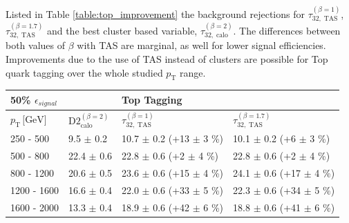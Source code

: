 Listed in Table \ref{table:top_improvement} the background rejections for $\tau_{32,\;\text{TAS}}^{(\beta=1)}$, $\tau_{32,\;\text{TAS}}^{(\beta=1.7)}$ and the best cluster based variable, $\tau_{32,\;\text{calo}}^{(\beta=2)}$. The differences between both values of $\beta$ with TAS are marginal, as well for lower signal efficiencies. Improvements due to the use of TAS instead of clusters are possible for Top quark tagging over the whole studied $p_{\mathrm{T}}$ range.
\begin{table}
\centering
\begin{tabular}{llll}
 \multicolumn{1}{l||}{\textbf{50\% $\epsilon_{signal}$}} &                                                & \textbf{Top Tagging}                                          &                                          \\ \hline
\multicolumn{1}{l||}{$p_{\mathrm{T}} \, \text{[GeV]}$}           & \multicolumn{1}{l|}{$\text{D2}_{\text{calo}}^{(\beta=2)}$} & \multicolumn{1}{l|}{$\tau_{32,\;\text{TAS}}^{(\beta=1)}$} & \multicolumn{1}{l|}{$\tau_{32,\;\text{TAS}}^{(\beta=1.7)}$} \\ \hline \hline
\multicolumn{1}{l||}{250 - 500}                       & \multicolumn{1}{l|}{9.5 $\pm$ 0.2}                      &  \multicolumn{1}{l|}{\cellcolor{Red!50}10.7 $\pm$ 0.2 (+13 $\pm$ 3 \%)}        & \multicolumn{1}{l|}{10.1 $\pm$ 0.2 (+6 $\pm$ 3 \%)}        \\
\multicolumn{1}{l||}{500 - 800}                       & \multicolumn{1}{l|}{22.4 $\pm$ 0.6}                      & \multicolumn{1}{l|}{\cellcolor{Red!50}22.8 $\pm$ 0.6 (+2 $\pm$ 4 \%)}         & \multicolumn{1}{l|}{\cellcolor{Red!50}22.8 $\pm$ 0.6 (+2 $\pm$ 4 \%)}         \\
\multicolumn{1}{l||}{800 - 1200}                      & \multicolumn{1}{l|}{20.6 $\pm$ 0.5}                      & \multicolumn{1}{l|}{23.6 $\pm$ 0.6 (+15 $\pm$ 4 \%)}        & \multicolumn{1}{l|}{\cellcolor{Red!50}24.1 $\pm$ 0.6 (+17 $\pm$ 4 \%)}        \\
\multicolumn{1}{l||}{1200 - 1600}                     & \multicolumn{1}{l|}{16.6 $\pm$ 0.4}                      & \multicolumn{1}{l|}{22.0 $\pm$ 0.6 (+33 $\pm$ 5 \%)}        & \multicolumn{1}{l|}{\cellcolor{Red!50}22.3 $\pm$ 0.6 (+34 $\pm$ 5 \%)}        \\
\multicolumn{1}{l||}{1600 - 2000}                     & \multicolumn{1}{l|}{13.3 $\pm$ 0.4}                      & \multicolumn{1}{l|}{\cellcolor{Red!50}18.9 $\pm$ 0.6 (+42 $\pm$ 6 \%)}        & \multicolumn{1}{l|}{18.8 $\pm$ 0.6 (+41 $\pm$ 6 \%)}       \\ 

\end{tabular}
\end{table}
